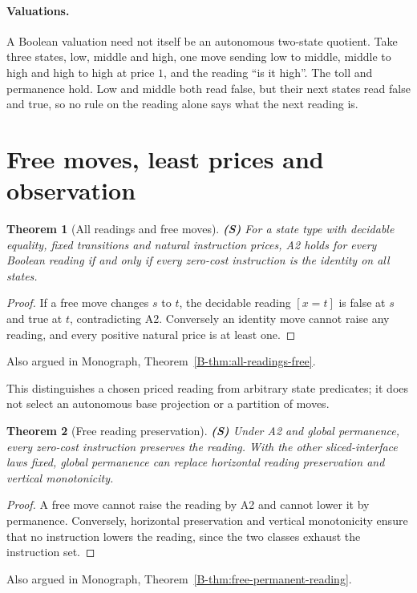 \documentclass[11pt, a4paper]{report}
\theoremstyle{definition}
\theoremstyle{plain}
\newtheorem{theorem}{Theorem}[chapter]
\begin{document}
\paragraph{Valuations.}
A Boolean valuation need not itself be an autonomous two-state quotient. Take
three states, low, middle and high, one move sending low to middle, middle to
high and high to high at price $1$, and the reading ``is it high''. The toll
and permanence hold. Low and middle both read false, but their next states read
false and true, so no rule on the reading alone says what the next reading is.

\section{Free moves, least prices and observation}

\begin{theorem}[All readings and free moves] \textbf{(S)}
For a state type with decidable equality, fixed transitions and natural
instruction prices, A2 holds for every Boolean reading if and only if every
zero-cost instruction is the identity on all states.
\end{theorem}
\begin{proof}
If a free move changes $s$ to $t$, the decidable reading $[x=t]$ is false at
$s$ and true at $t$, contradicting A2. Conversely an identity move cannot
raise any reading, and every positive natural price is at least one.
\end{proof}
\noindent Also argued in Monograph, Theorem~\ref{B-thm:all-readings-free}.

This distinguishes a chosen priced reading from arbitrary state predicates;
it does not select an autonomous base projection or a partition of moves.

\begin{theorem}[Free reading preservation] \textbf{(S)}
Under A2 and global permanence, every zero-cost instruction preserves the
reading. With the other sliced-interface laws fixed, global permanence can
replace horizontal reading preservation and vertical monotonicity.
\end{theorem}
\begin{proof}
A free move cannot raise the reading by A2 and cannot lower it by permanence.
Conversely, horizontal preservation and vertical monotonicity ensure that
no instruction lowers the reading, since the two classes exhaust the
instruction set.
\end{proof}
\noindent Also argued in Monograph, Theorem~\ref{B-thm:free-permanent-reading}.
\end{document}
